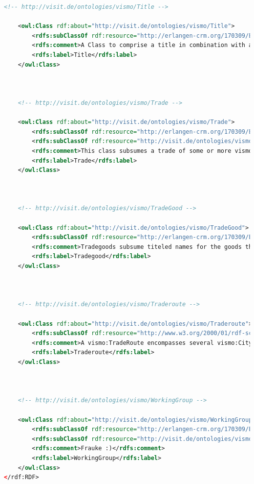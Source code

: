 \begin{lstlisting}[caption={VisMo Ontologie in der letzten (englischen) Version.},label={lst:vismo},captionpos=b,language=xml]
    <!-- http://visit.de/ontologies/vismo/Title -->

    <owl:Class rdf:about="http://visit.de/ontologies/vismo/Title">
        <rdfs:subClassOf rdf:resource="http://erlangen-crm.org/170309/E35_Title"/>
        <rdfs:comment>A Class to comprise a title in combination with a superordinate title of a reference collection that contains this vismo:Reference entity.</rdfs:comment>
        <rdfs:label>Title</rdfs:label>
    </owl:Class>
    


    <!-- http://visit.de/ontologies/vismo/Trade -->

    <owl:Class rdf:about="http://visit.de/ontologies/vismo/Trade">
        <rdfs:subClassOf rdf:resource="http://erlangen-crm.org/170309/E9_Move"/>
        <rdfs:subClassOf rdf:resource="http://visit.de/ontologies/vismo/Resource"/>
        <rdfs:comment>This class subsumes a trade of some or more vismo:TradeGood entities. A trade should always be associated with a vismo:TradeRoute.</rdfs:comment>
        <rdfs:label>Trade</rdfs:label>
    </owl:Class>
    


    <!-- http://visit.de/ontologies/vismo/TradeGood -->

    <owl:Class rdf:about="http://visit.de/ontologies/vismo/TradeGood">
        <rdfs:subClassOf rdf:resource="http://erlangen-crm.org/170309/E55_Type"/>
        <rdfs:comment>Tradegoods subsume titeled names for the goods that are transported and sold on vismo:TradeRoute objects.</rdfs:comment>
        <rdfs:label>Tradegood</rdfs:label>
    </owl:Class>
    


    <!-- http://visit.de/ontologies/vismo/Traderoute -->

    <owl:Class rdf:about="http://visit.de/ontologies/vismo/Traderoute">
        <rdfs:subClassOf rdf:resource="http://www.w3.org/2000/01/rdf-schema#Class"/>
        <rdfs:comment>A vismo:TradeRoute encompasses several vismo:City entities that are associated with the vismo:Trade that is associated with the given trade route. These cities can thereby be starting or end location, as well as an intermediate station.</rdfs:comment>
        <rdfs:label>Traderoute</rdfs:label>
    </owl:Class>
    


    <!-- http://visit.de/ontologies/vismo/WorkingGroup -->

    <owl:Class rdf:about="http://visit.de/ontologies/vismo/WorkingGroup">
        <rdfs:subClassOf rdf:resource="http://erlangen-crm.org/170309/E74_Group"/>
        <rdfs:subClassOf rdf:resource="http://visit.de/ontologies/vismo/Resource"/>
        <rdfs:comment>Frauke :)</rdfs:comment>
        <rdfs:label>WorkingGroup</rdfs:label>
    </owl:Class>
</rdf:RDF>

\end{lstlisting}

